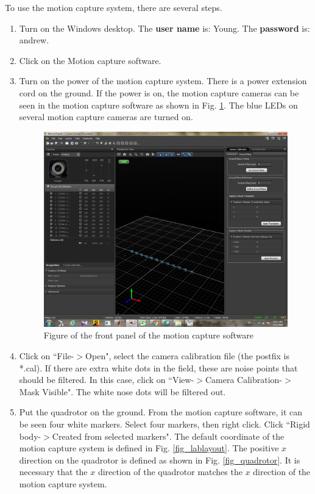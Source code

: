 \documentclass[idxtotoc,hyperref,openany]{labbook} %
\begin{document}
To use the motion capture system, there are several steps.

\begin{enumerate}
\item Turn on the Windows desktop.  The \textbf{user name} is: Young. The \textbf{password} is: andrew.
\item Click on the Motion capture software. 
\item Turn on the power of the motion capture system. There is a power extension cord on the ground. If the power is on, the motion capture cameras can be seen in the motion capture software as shown in Fig. \ref{fig_motioncapfront}. The blue LEDs on several motion capture cameras are turned on. 

\begin{figure}
\centering
\includegraphics[scale=0.2]{./Figure/fig_MotioncapFront}
\caption{Figure of the front panel of the motion capture software}\label{fig_motioncapfront}
\end{figure}
\item Click on ``File-$>$Open", select the camera calibration file (the postfix is *.cal). If there are extra white dots in the field, these are noise points that should be filtered. In this case, click on ``View-$>$Camera Calibration-$>$Mask Visible". The white nose dots will be filtered out.  
\item Put the quadrotor on the ground. From the motion capture software, it can be seen four white markers. Select four markers, then right click. Click ``Rigid body-$>$Created from selected markers". The default coordinate of the motion capture system is defined in Fig. \ref{fig_lablayout}. The positive $x$ direction on the quadrotor is defined as shown in Fig. \ref{fig_quadrotor}. It is necessary that the $x$ direction of the quadrotor matches the $x$ direction of the motion capture system.

\end{enumerate}
\end{document}
